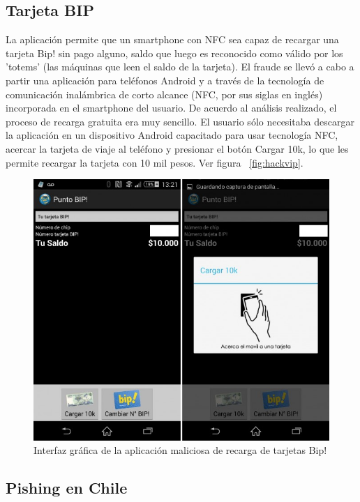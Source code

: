 \subsection{Tarjeta BIP}
La aplicación permite que un smartphone con NFC sea capaz de recargar una tarjeta Bip! sin pago alguno, saldo que luego es reconocido como válido por los 'totems' (las máquinas que leen el saldo de la tarjeta).
El fraude se llevó a cabo a partir una aplicación para teléfonos Android y a través de la tecnología de comunicación inalámbrica de corto alcance (NFC, por sus siglas en inglés) incorporada en el smartphone del usuario.\cite{bip}
De acuerdo al análisis realizado, el proceso de recarga gratuita era muy sencillo. El usuario sólo necesitaba descargar la aplicación en un dispositivo Android capacitado para usar tecnología NFC, acercar la tarjeta de viaje al teléfono y presionar el botón Cargar 10k, lo que les permite recargar la tarjeta con 10 mil pesos. Ver figura ~\ref{fig:hackvip}.
\begin{figure}[H]
\label{fig:hackvip}
\centering
\includegraphics[width=\textwidth]{img/hackvip.jpg}
\caption{Interfaz gráfica de la aplicación maliciosa de recarga de tarjetas Bip!}
\label{fig:diagrama01}
\end{figure}

\subsection{Pishing en Chile}

